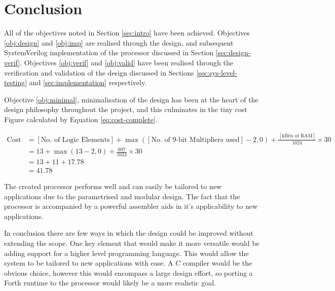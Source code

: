 \section{Conclusion}
All of the objectives noted in Section \ref{sec:intro} have been achieved. Objectives \ref{obj:design} and \ref{obj:imp} are realised through the design, and subsequent SystemVerilog implementation of the processor discussed in Section \ref{sec:design-verif}. Objectives \ref{obj:verif} and \ref{obj:valid} have been realised through the verification and validation of the design discussed in Sections \ref{sec:sys-level-testing} and \ref{sec:implementation} respectively.

Objective \ref{obj:minimal}, minimalisation of the design has been at the heart of the design philosophy throughout the project, and this culminates in the tiny cost Figure calculated by Equation \ref{eq:cost-complete}.

\begin{align}
\text{Cost} &= [\text{No. of Logic Elements}] + \max([\text{No. of 9-bit Multipliers used}] -2, 0) + \frac{ [\text{kBits of RAM}]}{1024} \times 30 \nonumber \\
&= 13 +  \max(13 -2, 0) + \frac{607}{1024} \times 30  \nonumber \\
&= 13 + 11 + 17.78  \nonumber \\
&= 41.78
\label{eq:cost-complete}
\end{align}

The created processor performs well and can easily be tailored to new applications due to the parametrised and modular design. The fact that the processor is accompanied by a powerful assembler aids in it's applicability to new applications.

In conclusion there are few ways in which the design could be improved without extending the scope. One key element that would make it more versatile would be adding support for a higher level programming language. This would allow the system to be tailored to new applications with ease. A C compiler would be the obvious choice, however this would encompass a large design effort, so porting a Forth runtime to the processor would likely be a more realistic goal.
